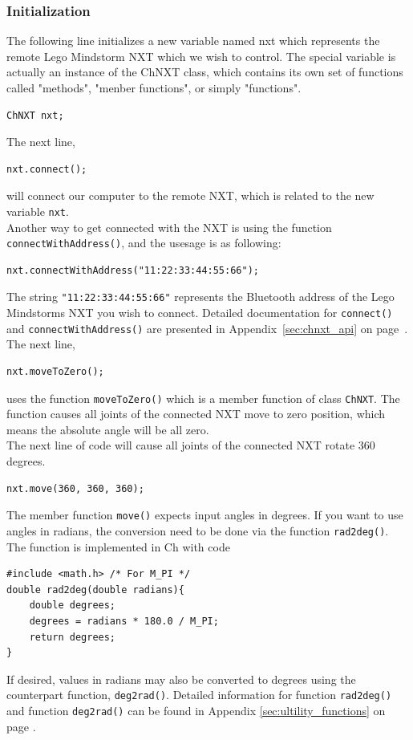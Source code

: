 \documentclass[11pt]{article}
\begin{document}
\subsubsection*{Initialization}
The following line initializes a new variable named nxt which represents the remote Lego Mindstorm NXT which
we wish to control. The special variable is actually an instance of the ChNXT class, which contains its own
set of functions called "methods", "menber functions", or simply "functions".
\begin{lstlisting}
ChNXT nxt;
\end{lstlisting}
The next line,
\begin{lstlisting}
nxt.connect();
\end{lstlisting}
will connect our computer to the remote NXT, which is related to the new variable {\tt nxt}.\\

Another way to get connected with the NXT is using the function {\tt connectWithAddress()}, and the usesage
is as following:
\begin{lstlisting}
nxt.connectWithAddress("11:22:33:44:55:66");
\end{lstlisting}
The string {\tt "11:22:33:44:55:66"} represents the Bluetooth address of the Lego Mindstorms NXT you wish 
to connect. Detailed documentation for {\tt connect()} and {\tt connectWithAddress()} are presented in 
Appendix~\ref{sec:chnxt_api} on page~\pageref{sec:chnxt_api}. The next line,
\begin{lstlisting}
nxt.moveToZero();
\end{lstlisting}
uses the function {\tt moveToZero()} which is a member function of class {\tt ChNXT}. The function causes
all joints of the connected NXT move to zero position, which means the absolute angle will be all zero.\\

The next line of code will cause all joints of the connected NXT rotate 360 degrees.
\begin{lstlisting}
nxt.move(360, 360, 360);
\end{lstlisting}
The member function {\tt move()} expects input angles in degrees. If you want to use angles in radians, the 
conversion need to be done via the function {\tt rad2deg()}. The function is implemented in Ch with code
\begin{lstlisting}
#include <math.h> /* For M_PI */
double rad2deg(double radians){
    double degrees;
    degrees = radians * 180.0 / M_PI;
    return degrees;
}
\end{lstlisting}
If desired, values in radians may also be converted to degrees using the counterpart function, {\tt deg2rad()}.
Detailed information for function {\tt rad2deg()} and function {\tt deg2rad()} can be found in Appendix 
\ref{sec:ultility_functions} on page \pageref{sec:ultility_functions}.\\
\end{document}
